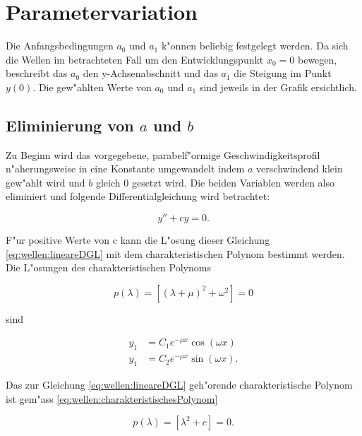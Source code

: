 \section{Parametervariation}

Die Anfangsbedingungen $a_0$ und $a_1$ k"onnen beliebig festgelegt werden. Da 
sich die Wellen im betrachteten Fall um den Entwicklungspunkt $x_0=0$ bewegen, 
beschreibt das $a_0$ den y-Achsenabschnitt und das $a_1$ die Steigung im Punkt 
$y(0)$. Die gew"ahlten Werte von $a_0$ und $a_1$ sind jeweils in der Grafik 
ersichtlich.

\subsection{Eliminierung von \texorpdfstring{$a$}{a} und 
\texorpdfstring{$b$}{b}}
\label{subsec:wellen:Eliminierungab}

Zu Beginn wird das vorgegebene, parabelf"ormige Geschwindigkeitsprofil 
n"aherungsweise in eine Konstante umgewandelt indem $a$ verschwindend klein 
gew"ahlt wird und $b$ gleich $0$ gesetzt wird. Die beiden Variablen werden also 
eliminiert und folgende Differentialgleichung wird betrachtet:

\begin{equation}
	y''+ cy = 0.
	\label{eq:wellen:lineareDGL}
\end{equation}


F"ur positive Werte von c kann die L"osung dieser Gleichung 
\ref{eq:wellen:lineareDGL} mit dem charakteristischen Polynom bestimmt werden. 
Die L"osungen des charakteristischen Polynoms

\begin{equation}
	p(\lambda) = [(\lambda+\mu)^2+\omega^2] =0
	\label{eq:wellen:charakteristischesPolynom}
\end{equation}

sind

\begin{equation}
	\begin{split}
	y_1 &= C_1e^{-\mu x}\cos(\omega x) \\
	y_1 &= C_2e^{-\mu x}\sin(\omega x).
	\end{split}
	\label{eq:wellen:lsgcharakteristischesPolynom}
\end{equation}

Das zur Gleichung \ref{eq:wellen:lineareDGL} geh"orende charakteristische 
Polynom 
ist gem"ass \ref{eq:wellen:charakteristischesPolynom}

\begin{equation*}
	p(\lambda) = [\lambda^2 + c] =0.
\end{equation*}

